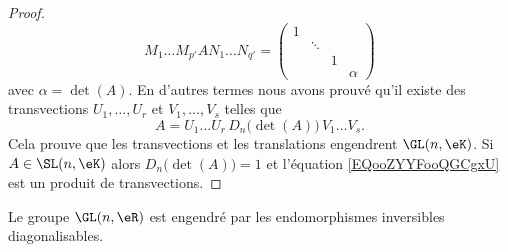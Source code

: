 \begin{proof}
    \begin{equation}
        M_1\ldots M_{p'}AN_1\ldots N_{q'}=
        \begin{pmatrix}
             1   &       &       &       \\
                &   \ddots    &       &       \\
                &       &   1    &       \\ 
                &       &       &   \alpha     
         \end{pmatrix}
    \end{equation}
    avec \( \alpha=\det(A)\). En d'autres termes nous avons prouvé qu'il existe des transvections \( U_1,\ldots, U_r\) et \( V_1,\ldots, V_s\) telles que
    \begin{equation}        \label{EQooZYYFooQGCgxU}
        A=U_1\ldots U_r\,D_n\big( \det(A) \big)\,V_1\ldots V_s.
    \end{equation}
    Cela prouve que les transvections et les translations engendrent \( \GL(n,\eK)\). Si \( A\in \SL(n,\eK)\) alors \( D_n\big( \det(A) \big)=1\) et l'équation \eqref{EQooZYYFooQGCgxU} est un produit de transvections.
\end{proof}

\begin{proposition}
    Le groupe \( \GL(n,\eR)\) est engendré par les endomorphismes inversibles diagonalisables.
\end{proposition}

